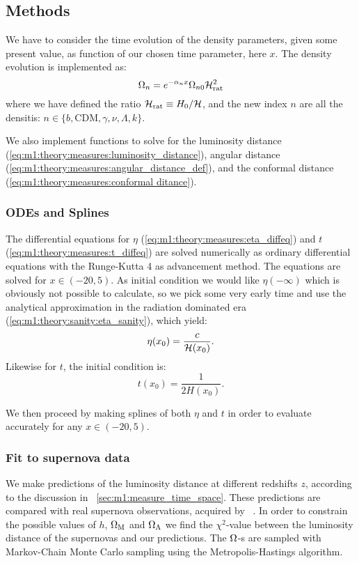 \subsection{Methods}\label{sec:m1:methods}
    We have to consider the time evolution of the density parameters, given some present value, as function of our chosen time parameter, here $x$. The density evolution is implemented as:
    \begin{equation}\label{eq:m1:methods:initial:density_evolution}
        \Omega_n = e^{-\alpha_nx}\Omega_{n0}\mathcal{H}_\mathrm{rat}^2
    \end{equation}
    where we have defined the ratio $\mathcal{H}_\mathrm{rat} \equiv H_0/\mathcal{H}$, and the new index $n$ are all the densitis: $n\in\{b, \mathrm{CDM}, \gamma, \nu, \Lambda, k\}$.

    We also implement functions to solve for the luminosity distance (\cref{eq:m1:theory:measures:luminosity_distance}), angular distance (\cref{eq:m1:theory:measures:angular_distance_def}), and the conformal distance (\cref{eq:m1:theory:measures:conformal ditance}).


\subsubsection{ODEs and Splines}
    The differential equations for $\eta$ (\cref{eq:m1:theory:measures:eta_diffeq}) and $t$ (\cref{eq:m1:theory:measures:t_diffeq}) are solved numerically as ordinary differential equations with the Runge-Kutta 4 as advancement method. The equations are solved for $x\in(-20,5)$. As initial condition we would like $\eta(-\infty)$ which is obviously not possible to calculate, so we pick some very early time and use the analytical approximation in the radiation dominated era (\cref{eq:m1:theory:sanity:eta_sanity}), which yield:
    \begin{equation}\label{eq:m1:methods:odes:eta_initial}
        \eta(x_0) = \frac{c}{\mathcal{H}(x_0)}.
    \end{equation}
    Likewise for $t$, the initial condition is:
    \begin{equation}\label{eq:m1:methods:odes:t_initial}
        t(x_0) = \frac{1}{2H(x_0)}.
    \end{equation}
    
    We then proceed by making splines of both $\eta$ and $t$ in order to evaluate accurately for any $x\in(-20,5)$. 


\subsubsection{Fit to supernova data}
    We make predictions of the luminosity distance at different redshifts $z$, according to the discussion in ~\cref{sec:m1:measure_time_space}. These predictions are compared with real supernova observations, acquired by ~\cite{Betoule_2014}. In order to constrain the possible values of $h$, $\Omega_\mathrm{M}$ and $\Omega_\Lambda$ we find the $\chi^2$-value between the luminosity distance of the supernovas and our predictions. The $\Omega$-s are sampled with Markov-Chain Monte Carlo sampling using the Metropolis-Hastings algorithm. 
    
